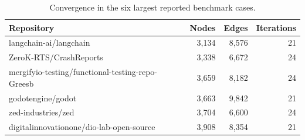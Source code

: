 \begin{table}[tbp]
\centering
\caption{Convergence in the six largest reported benchmark cases.}\label{tab:ch6-convergence}
\fontsize{9.3}{11.6}\selectfont
\renewcommand{\arraystretch}{1.13}
\begin{tabularx}{\textwidth}{@{}>{\raggedright\arraybackslash}Xrrr@{}}
\toprule
Repository & Nodes & Edges & Iterations\\
\midrule
langchain-\allowbreak ai/\allowbreak langchain & 3,134 & 8,576 & 21\\
ZeroK-\allowbreak RTS/\allowbreak CrashReports & 3,338 & 6,672 & 24\\
mergifyio-\allowbreak testing/\allowbreak functional-\allowbreak testing-\allowbreak repo-\allowbreak Greesb & 3,659 & 8,182 & 24\\
godotengine/\allowbreak godot & 3,663 & 9,842 & 21\\
zed-\allowbreak industries/\allowbreak zed & 3,704 & 6,600 & 24\\
digitalinnovationone/\allowbreak dio-\allowbreak lab-\allowbreak open-\allowbreak source & 3,908 & 8,354 & 21\\
\bottomrule
\end{tabularx}
\end{table}
